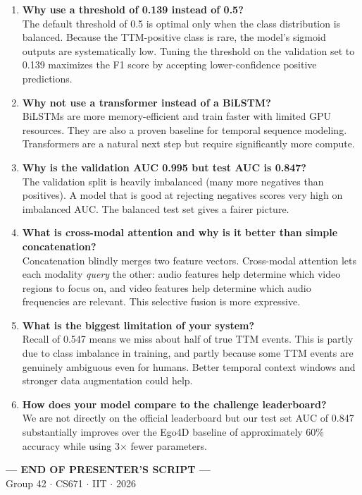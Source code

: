 \documentclass[11pt, a4paper]{article}
\begin{document}
\vspace{0.4cm}
\begin{tcolorbox}[
  colback=AccBlue!8, colframe=AccBlue,
  leftrule=5pt, arc=3pt,
  title={\bfseries Likely Q\&A Questions --- Prepare These Answers}
]
\begin{enumerate}[leftmargin=*, itemsep=6pt]
  \item \textbf{Why use a threshold of 0.139 instead of 0.5?}\\
  {\small The default threshold of 0.5 is optimal only when the class distribution is balanced. Because the TTM-positive class is rare, the model's sigmoid outputs are systematically low. Tuning the threshold on the validation set to 0.139 maximizes the F1 score by accepting lower-confidence positive predictions.}

  \item \textbf{Why not use a transformer instead of a BiLSTM?}\\
  {\small BiLSTMs are more memory-efficient and train faster with limited GPU resources. They are also a proven baseline for temporal sequence modeling. Transformers are a natural next step but require significantly more compute.}

  \item \textbf{Why is the validation AUC 0.995 but test AUC is 0.847?}\\
  {\small The validation split is heavily imbalanced (many more negatives than positives). A model that is good at rejecting negatives scores very high on imbalanced AUC. The balanced test set gives a fairer picture.}

  \item \textbf{What is cross-modal attention and why is it better than simple concatenation?}\\
  {\small Concatenation blindly merges two feature vectors. Cross-modal attention lets each modality \textit{query} the other: audio features help determine which video regions to focus on, and video features help determine which audio frequencies are relevant. This selective fusion is more expressive.}

  \item \textbf{What is the biggest limitation of your system?}\\
  {\small Recall of 0.547 means we miss about half of true TTM events. This is partly due to class imbalance in training, and partly because some TTM events are genuinely ambiguous even for humans. Better temporal context windows and stronger data augmentation could help.}

  \item \textbf{How does your model compare to the challenge leaderboard?}\\
  {\small We are not directly on the official leaderboard but our test set AUC of 0.847 substantially improves over the Ego4D baseline of approximately 60\% accuracy while using 3$\times$ fewer parameters.}
\end{enumerate}
\end{tcolorbox}

\vspace{0.5cm}
\begin{center}
{\large\bfseries\color{NavyBlue} --- END OF PRESENTER'S SCRIPT ---}\\[0.2cm]
{\color{MidText}\small Group 42 $\cdot$ CS671 $\cdot$ IIT $\cdot$ 2026}
\end{center}
\end{document}
